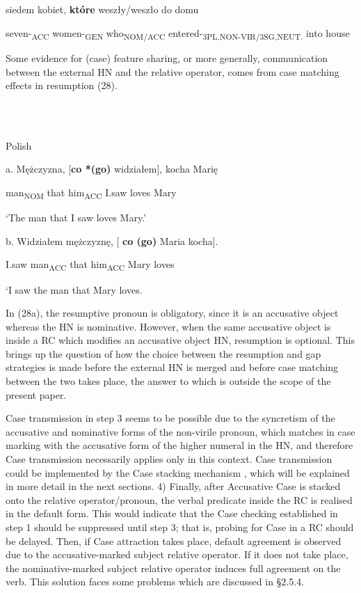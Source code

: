 \documentclass[output=paper]{langsci/langscibook}
\begin{document}
\ea%
    \label{ex:key:27}
    \gll\\
        \\
    \glt
    \z

           siedem   kobiet,   \textbf{które}     weszły/weszło       do domu

  seven-\textsubscript{ACC}   women-\textsubscript{GEN}   who\textsubscript{NOM/ACC}   entered-\textsubscript{3PL,NON-VIR/3SG,NEUT.} into house

 

Some evidence for (case) feature sharing, or more generally, communication between the external HN and the relative operator, comes from case matching effects in resumption (28).

\ea%
    \label{ex:key:28}
    \gll\\
        \\
    \glt
    \z

          Polish

a.   Mężczyzna, [\textbf{co *(go)}   widziałem],   kocha   Marię     

    man\textsubscript{NOM}   that him\textsubscript{ACC}   I.saw     loves   Mary

 ‘The man that I saw loves Mary.’

  b.   Widziałem   mężczyznę, [  \textbf{co (go)}   Maria   kocha]. 

    I.saw     man\textsubscript{ACC}   that him\textsubscript{ACC}   Mary   loves

   ‘I saw the man that Mary loves.

In (28a), the resumptive pronoun is obligatory, since it is an accusative object whereas the HN is nominative. However, when the same accusative object is inside a RC which modifies an accusative object HN, resumption is optional. This brings up the question of how the choice between the resumption and gap strategies is made before the external HN is merged and before case matching between the two takes place, the answer to which is outside the scope of the present paper. 

Case transmission in step 3 seems to be possible due to the syncretism of the accusative and nominative forms of the non-virile pronoun, which matches in case marking with the accusative form of the higher numeral in the HN, and therefore Case transmission necessarily applies only in this context. Case transmission could be implemented by the Case stacking mechanism \citep{Vogel2001}, which will be explained in more detail in the next sections. 4) Finally, after Accusative Case is stacked onto the relative operator/pronoun, the verbal predicate inside the RC is realised in the default form. This would indicate that the Case checking established in step 1 should be suppressed until step 3; that is, probing for Case in a RC should be delayed. Then, if Case attraction takes place, default agreement is observed due to the accusative-marked subject relative operator. If it does not take place, the nominative-marked subject relative operator induces full agreement on the verb. This solution faces some problems which are discussed in §2.5.4.
\end{document}
